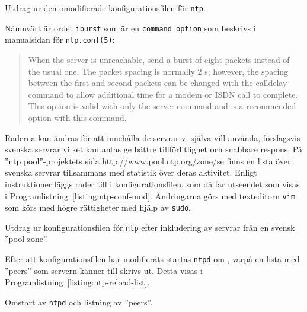 \begin{listing}[H]
\caption{Utdrag ur den omodifierade konfigurationsfilen för \texttt{ntp}.}
\label{listing:ntp-conf}
\end{listing}

Nämnvärt är ordet \texttt{iburst} som är en \texttt{command option} som 
beskrivs i manualsidan för \texttt{ntp.conf(5)}:

\begin{quotation}
When  the  server  is  unreachable, send a burst of eight packets
instead of the usual one.  The packet spacing is normally 2 s; however, the
spacing between the first and second packets can be changed with the calldelay
command to allow additional time for a modem or ISDN call to  complete.   This
option is valid with only the server command and is a recommended option with
this command.
\end{quotation}


Raderna kan ändras för att innehålla de servrar vi själva vill använda,
förslagsvis svenska servrar vilket kan antas ge bättre tillförlitlighet och
snabbare respons. 
På ''ntp pool''-projektets sida \url{http://www.pool.ntp.org/zone/se} finns en
lista över svenska servrar tillsammans med statistik över deras aktivitet.
Enligt instruktioner \cite{ntp:pool-use} läggs rader till i
konfigurationsfilen, som då får utseendet som visas i
Programlistning~\ref{listing:ntp-conf-mod}.  Ändringarna görs med texteditorn
\texttt{vim} som körs med högre rättigheter med hjälp av \texttt{sudo}.

\begin{listing}[H]
\caption{Utdrag ur konfigurationsfilen för \texttt{ntp} efter inkludering av
servrar från en svensk ''pool zone''.}
\label{listing:ntp-conf-mod}
\end{listing}


Efter att konfigurationsfilen har modifierats startas \texttt{ntpd} om
\cite{ubuntu:ntp-serverguide}, varpå en lista med ''peers'' som servern känner
till skrivs ut. Detta visas i Programlistning~\ref{listing:ntp-reload-list}.

\begin{listing}[H]
\caption{Omstart av \texttt{ntpd} och listning av ''peers''.}
\label{listing:ntp-reload-list}
\end{listing}
